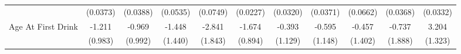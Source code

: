 {\begin{tabular}{l*{10}{c}}
            &    (0.0373)         &    (0.0388)         &    (0.0535)         &    (0.0749)         &    (0.0227)         &    (0.0320)         &    (0.0371)         &    (0.0662)         &    (0.0368)         &    (0.0332)         \\
\addlinespace
Age At First Drink&      -1.211         &      -0.969         &      -1.448         &      -2.841         &      -1.674         &      -0.393         &      -0.595         &      -0.457         &      -0.737         &       3.204\sym{*}  \\
            &     (0.983)         &     (0.992)         &     (1.440)         &     (1.843)         &     (0.894)         &     (1.129)         &     (1.148)         &     (1.402)         &     (1.888)         &     (1.323)         \\
\bottomrule
\end{tabular}
}
